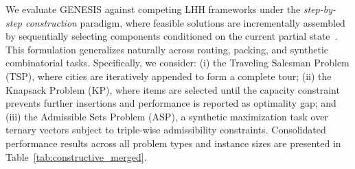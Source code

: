 \documentclass[sigconf,anonymous]{aamas}
\begin{document}
We evaluate GENESIS against competing LHH frameworks under the \emph{step-by-step construction} paradigm, where feasible solutions are incrementally assembled by sequentially selecting components conditioned on the current partial state~\cite{asani2023convexhull,bello2017neuralcombinatorialoptimizationreinforcement}. This formulation generalizes naturally across routing, packing, and synthetic combinatorial tasks. Specifically, we consider: (i) the Traveling Salesman Problem (TSP), where cities are iteratively appended to form a complete tour; (ii) the Knapsack Problem (KP), where items are selected until the capacity constraint prevents further insertions and performance is reported as optimality gap; and (iii) the Admissible Sets Problem (ASP), a synthetic maximization task over ternary vectors subject to triple-wise admissibility constraints. Consolidated performance results across all problem types and instance sizes are presented in Table~\ref{tab:constructive_merged}.
\end{document}
